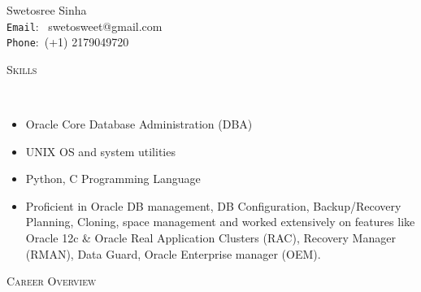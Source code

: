 \documentclass[9pt]{article}
\newenvironment{changemargin}[2]{%
  \begin{list}{}{%
    \setlength{\topsep}{0pt}%
    \setlength{\leftmargin}{#1}%
    \setlength{\rightmargin}{#2}%
    \setlength{\listparindent}{\parindent}%
    \setlength{\itemindent}{\parindent}%
    \setlength{\parsep}{\parskip}%
  }%
  \item[]}{\end{list}
}
\newcommand{\lineover}{
	\begin{changemargin}{-0.05in}{-0.05in}
		\vspace*{-8pt}
		\hrulefill \\
		\vspace*{-2pt}
	\end{changemargin}
}
\newcommand{\header}[1]{
	\begin{changemargin}{-0.5in}{-0.5in}
		\scshape{#1}\\
  	\lineover
	\end{changemargin}
}
\newenvironment{body} {
	\vspace*{-16pt}
	\begin{changemargin}{-0.25in}{-0.5in}
  }
	{\end{changemargin}
}
\begin{document}
	\begin{changemargin}{-0.5in}{-0.5in}
\begin{center}
 {\Large Swetosree Sinha} \\
 {{\texttt{Email}:\,\,\;\;\, swetosweet@gmail.com}} \\
 {{\texttt{Phone}:\;\;\,   (+1) 2179049720}} \\
\end{center}

\end{changemargin}


\header{Skills}
\begin{body}
	\vspace{14pt}
	\begin{itemize} \itemsep -0pt
    \item Oracle Core Database Administration (DBA)
    \item UNIX OS and system utilities
    \item Python, C Programming Language
    \item Proficient in Oracle DB management, DB Configuration, Backup/Recovery Planning, Cloning, space management and worked extensively on features like Oracle 12c \& Oracle Real Application Clusters (RAC), Recovery Manager (RMAN), Data Guard, Oracle Enterprise manager (OEM).
	  \end{itemize}

        \medskip
\end{body}


\smallskip


\header{Career Overview}
\end{document}
